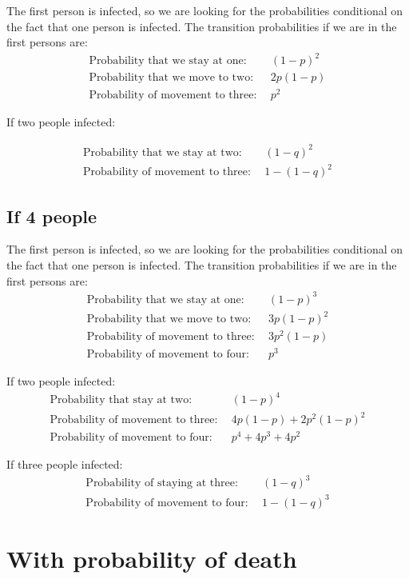 \documentclass[12pt]{report}
\numberwithin{equation}{section}
\begin{document}
The first person is infected, so we are looking for the probabilities conditional on the fact that one person is infected. The transition probabilities if we are in the first persons are:
\begin{align}
\text{Probability that we stay at one:}& ~~(1-p)^2 \\
\text{Probability that we move to two:}&~~ 2p(1-p) \\
\text{Probability of movement to three:}& ~~p^2
\end{align}

If two people infected:

\begin{align} 
\text{Probability that we stay at two:}& ~~(1-q)^2 \\
\text{Probability of movement to three:}& ~~1-(1-q)^2
\end{align}

\subsection{If 4 people}

The first person is infected, so we are looking for the probabilities conditional on the fact that one person is infected. The transition probabilities if we are in the first persons are:
\begin{align}
\text{Probability that we stay at one:}& ~~(1-p)^3 \\
\text{Probability that we move to two:}& ~~3p(1-p)^2 \\
\text{Probability of movement to three:}& ~~3p^2(1-p) \\
\text{Probability of movement to four:}& ~~p^3
\end{align}

If two people infected:
\begin{align}
\text{Probability that stay at two:}&~~ (1-p)^4 \\
\text{Probability of movement to three:}& ~~4p(1-p)+2p^2(1-p)^2 \\
\text{Probability of movement to four:}& ~~p^4 + 4p^3+4p^2
\end{align}

If three people infected:
\begin{align}
\text{Probability of staying at three:}& ~~ (1-q)^3 \\
\text{Probability of movement to four:}& ~~1-(1-q)^3
\end{align}

\section{With probability of death}
\end{document}
